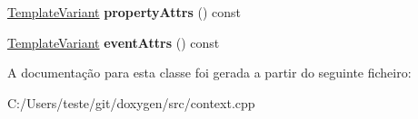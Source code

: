 \begin{DoxyCompactItemize}
\item 
\hypertarget{class_member_context_1_1_private_aa4dd47b1442b75886dd5bffe2053025d}{\hyperlink{class_template_variant}{Template\-Variant} {\bfseries property\-Attrs} () const }\label{class_member_context_1_1_private_aa4dd47b1442b75886dd5bffe2053025d}

\item 
\hypertarget{class_member_context_1_1_private_a139b23e1b81e66c4afc884ab7ce05a2c}{\hyperlink{class_template_variant}{Template\-Variant} {\bfseries event\-Attrs} () const }\label{class_member_context_1_1_private_a139b23e1b81e66c4afc884ab7ce05a2c}

\end{DoxyCompactItemize}


A documentação para esta classe foi gerada a partir do seguinte ficheiro\-:\begin{DoxyCompactItemize}
\item 
C\-:/\-Users/teste/git/doxygen/src/context.\-cpp\end{DoxyCompactItemize}
